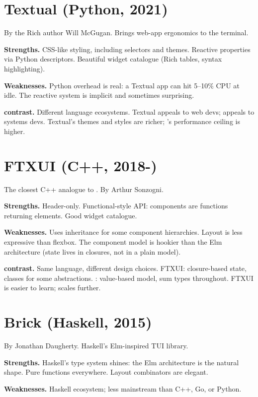 \section{Textual (Python, 2021)}

By the Rich author Will McGugan. Brings web-app ergonomics to
the terminal.

\textbf{Strengths.} CSS-like styling, including selectors and
themes. Reactive properties via Python descriptors. Beautiful
widget catalogue (Rich tables, syntax highlighting).

\textbf{Weaknesses.} Python overhead is real: a Textual app can
hit 5--10\% CPU at idle. The reactive system is implicit and
sometimes surprising.

\textbf{\maya{} contrast.} Different language ecosystems. Textual
appeals to web devs; \maya{} appeals to systems devs. Textual's
themes and styles are richer; \maya{}'s performance ceiling is
higher.

\section{FTXUI (C++, 2018-)}

The closest C++ analogue to \maya{}. By Arthur Sonzogni.

\textbf{Strengths.} Header-only. Functional-style API: components
are functions returning elements. Good widget catalogue.

\textbf{Weaknesses.} Uses inheritance for some component
hierarchies. Layout is less expressive than flexbox. The
component model is hookier than the Elm architecture (state lives
in closures, not in a plain model).

\textbf{\maya{} contrast.} Same language, different design
choices. FTXUI: closure-based state, classes for some
abstractions. \maya{}: value-based model, sum types throughout.
FTXUI is easier to learn; \maya{} scales further.

\section{Brick (Haskell, 2015)}

By Jonathan Daugherty. Haskell's Elm-inspired TUI library.

\textbf{Strengths.} Haskell's type system shines: the Elm
architecture is the natural shape. Pure functions everywhere.
Layout combinators are elegant.

\textbf{Weaknesses.} Haskell ecosystem; less mainstream than C++,
Go, or Python.

